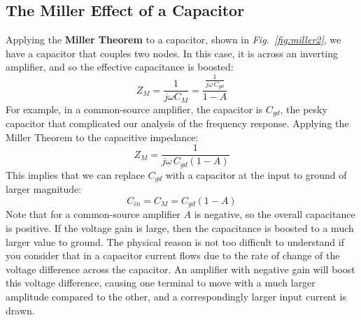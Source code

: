 \subsection{The Miller Effect of a Capacitor}
Applying the \textbf{Miller Theorem} to a capacitor, shown in \emph{Fig.~\ref{fig:miller2}}, we have a capacitor that couples two nodes.  In this case, it is across an inverting amplifier, and so the effective capacitance is boosted:
    \begin{equation}
        Z_M = \frac{1}{j\omega C_M} = \frac{\frac{1}{j\omega\,C_{gd}}}{1 - A}
    \end{equation}
For example, in a common-source amplifier, the capacitor is $C_{gd}$, the pesky capacitor that complicated our analysis of the frequency response.  Applying the Miller Theorem to the capacitive impedance: 
    \begin{equation}
        Z_M = \frac{1}{j\omega\,C_{gd} (1 - A)}
    \end{equation}
This implies that we can replace $C_{gd}$ with a capacitor at the input to ground of larger magnitude:
    \begin{equation}
        C_{in} = C_M  = C_{gd} (1-A)
    \end{equation}
Note that for a common-source amplifier $A$ is negative, so the overall capacitance is positive.  If the voltage gain is large, then the capacitance is boosted to a much larger value to ground.  The physical reason is not too difficult to understand if you consider that in a capacitor current flows due to the rate of change of the voltage difference  across the capacitor.  An amplifier with negative gain will boost this voltage difference, causing one terminal to move with a much larger amplitude compared to the other, and a correspondingly larger input current is drawn. 

